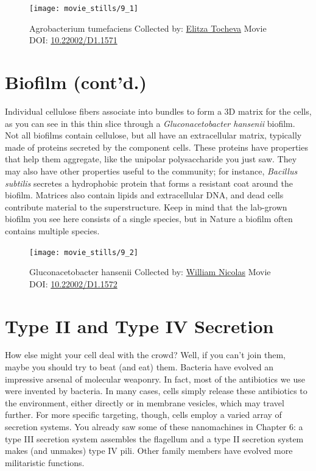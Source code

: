 \documentclass[]{tufte-book}
\begin{document}
\begin{figure}
\texttt{[image: movie\_stills/9\_1]} \caption[Agrobacterium tumefaciens Collected by:
\protect\hyperlink{elitza_tocheva}{Elitza Tocheva} Movie DOI:
\href{https://doi.org/10.22002/D1.1571}{10.22002/D1.1571}]{Agrobacterium tumefaciens Collected by:
\protect\hyperlink{elitza_tocheva}{Elitza Tocheva} Movie DOI:
\href{https://doi.org/10.22002/D1.1571}{10.22002/D1.1571}}\label{fig:9-1}
\end{figure}

\section{Biofilm (cont'd.)}\label{biofilm-contd.}

Individual cellulose fibers associate into bundles to form a 3D matrix
for the cells, as you can see in this thin slice through a
\emph{Gluconacetobacter hansenii} biofilm. Not all biofilms contain
cellulose, but all have an extracellular matrix, typically made of
proteins secreted by the component cells. These proteins have properties
that help them aggregate, like the unipolar polysaccharide you just saw.
They may also have other properties useful to the community; for
instance, \emph{Bacillus subtilis} secretes a hydrophobic protein that
forms a resistant coat around the biofilm. Matrices also contain lipids
and extracellular DNA, and dead cells contribute material to the
superstructure. Keep in mind that the lab-grown biofilm you see here
consists of a single species, but in Nature a biofilm often contains
multiple species.





\begin{figure}
\texttt{[image: movie\_stills/9\_2]} \caption[Gluconacetobacter hansenii Collected by:
\protect\hyperlink{william_nicolas}{William Nicolas} Movie DOI:
\href{https://doi.org/10.22002/D1.1572}{10.22002/D1.1572}]{Gluconacetobacter hansenii Collected by:
\protect\hyperlink{william_nicolas}{William Nicolas} Movie DOI:
\href{https://doi.org/10.22002/D1.1572}{10.22002/D1.1572}}\label{fig:9-2}
\end{figure}

\section{Type II and Type IV
Secretion}\label{type-ii-and-type-iv-secretion}

How else might your cell deal with the crowd? Well, if you can't join
them, maybe you should try to beat (and eat) them. Bacteria have evolved
an impressive arsenal of molecular weaponry. In fact, most of the
antibiotics we use were invented by bacteria. In many cases, cells
simply release these antibiotics to the environment, either directly or
in membrane vesicles, which may travel further. For more specific
targeting, though, cells employ a varied array of secretion systems. You
already saw some of these nanomachines in Chapter 6: a type III
secretion system assembles the flagellum and a type II secretion system
makes (and unmakes) type IV pili. Other family members have evolved more
militaristic functions.
\end{document}
